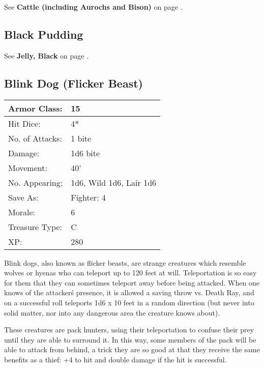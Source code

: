 \documentclass[a4paper,twoside,openany,10pt]{book}
\begin{document}
\begin{multicols}{2}
See \textbf{Cattle (including Aurochs and Bison)} on page \hyperlink{cattle-including-aurochs-and-bison}{\pageref{cattle-including-aurochs-and-bison}}.

\subsection*{Black Pudding}\label{black-pudding}

See \textbf{Jelly, Black} on page \hyperlink{jelly-black-black-pudding}{\pageref{jelly-black-black-pudding}}.

\subsection*{Blink Dog (Flicker Beast)}\label{blink-dog-flicker-beast}

\begin{tabularx}{0.48\textwidth}{@{}lX@{}}
Armor Class: & 15 \\\hline
Hit Dice: & 4* \\\hline
No. of Attacks: & 1 bite \\\hline
Damage: & 1d6 bite \\\hline
Movement: & 40' \\\hline
No. Appearing: & 1d6, Wild 1d6, Lair 1d6 \\\hline
Save As: & Fighter: 4 \\\hline
Morale: & 6 \\\hline
Treasure Type: & C \\\hline
XP: & 280 \\\hline
\end{tabularx}\medskip

Blink dogs, also known as flicker beasts, are strange creatures which resemble wolves or hyenas who can teleport up to 120 feet at will. Teleportation is so easy for them that they can sometimes teleport away before being attacked. When one knows of the attacker\'s presence, it is allowed a saving throw vs. Death Ray, and on a successful roll teleports 1d6 x 10 feet in a random direction (but never into solid matter, nor into any dangerous area the creature knows about).

These creatures are pack hunters, using their teleportation to confuse their prey until they are able to surround it. In this way, some members of the pack will be able to attack from behind, a trick they are so good at that they receive the same benefits as a thief: +4 to hit and double damage if the hit is successful.


\end{multicols}
\end{document}
